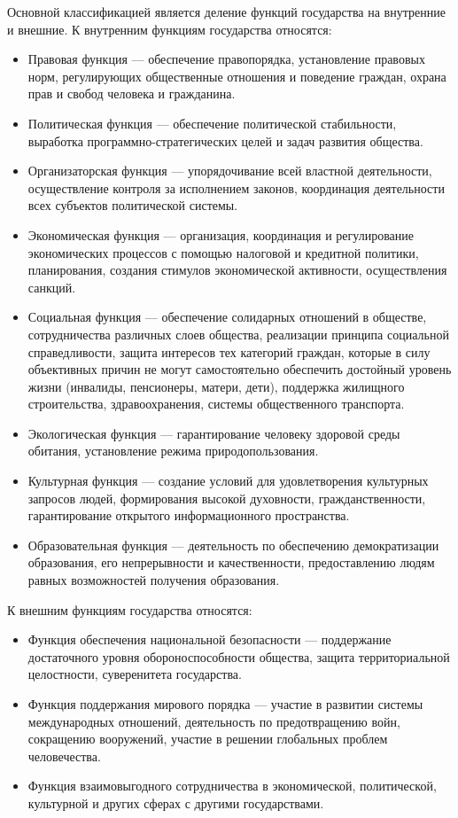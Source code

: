 \documentclass[12pt]{article}
\begin{document}
  Основной классификацией является деление функций государства на внутренние и внешние. К внутренним
функциям государства относятся:
\begin{itemize}
\item Правовая функция — обеспечение правопорядка, установление правовых норм, регулирующих общественные
отношения и поведение граждан, охрана прав и свобод человека и гражданина.
\item Политическая функция — обеспечение политической стабильности, выработка программно-стратегических
целей и задач развития общества.
\item  Организаторская  функция  —  упорядочивание  всей  властной  деятельности,  осуществление  контроля  за
исполнением законов, координация деятельности всех субъектов политической системы.
\item Экономическая функция — организация, координация и регулирование экономических процессов с помощью
налоговой и кредитной политики, планирования, создания стимулов экономической активности, осуществления
санкций.
\item Социальная функция — обеспечение солидарных отношений в обществе, сотрудничества различных слоев
общества, реализации принципа социальной справедливости, защита интересов тех категорий граждан, которые
в  силу  объективных  причин  не  могут  самостоятельно  обеспечить  достойный  уровень  жизни  (инвалиды,
пенсионеры, матери, дети), поддержка жилищного строительства, здравоохранения, системы общественного
транспорта.
\item  Экологическая  функция  —  гарантирование  человеку  здоровой  среды  обитания,  установление  режима
природопользования.
\item Культурная функция — создание условий для удовлетворения культурных запросов людей, формирования
высокой духовности, гражданственности, гарантирование открытого информационного пространства.
\item Образовательная функция — деятельность по обеспечению демократизации образования, его непрерывности
и качественности, предоставлению людям равных возможностей получения образования.
\end{itemize}

К внешним функциям государства относятся:
\begin{itemize}
\item Функция обеспечения национальной безопасности — поддержание достаточного уровня обороноспособности
общества, защита территориальной целостности, суверенитета государства.
\item  Функция  поддержания  мирового  порядка  —  участие  в  развитии  системы  международных  отношений,
деятельность по предотвращению войн, сокращению вооружений, участие в решении глобальных проблем
человечества.
\item Функция взаимовыгодного сотрудничества в экономической, политической, культурной и других сферах с
другими государствами.
\end{itemize}
\end{document}
